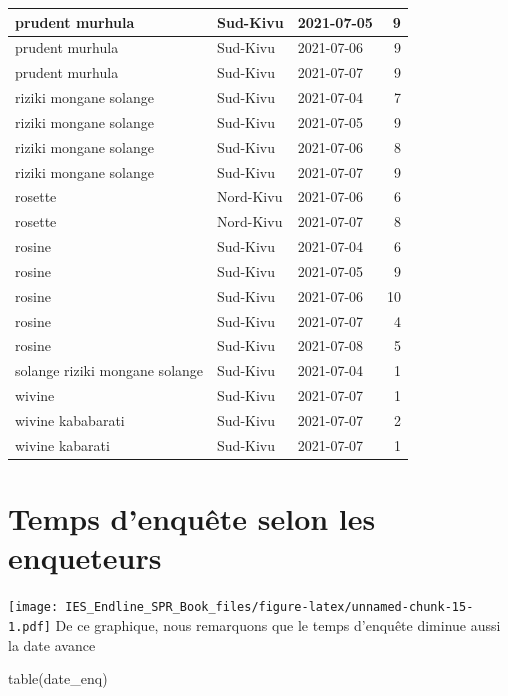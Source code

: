 \documentclass[
]{book}
\newenvironment{Shaded}{\begin{snugshade}}{\end{snugshade}}
\newcommand{\FunctionTok}[1]{\textcolor[rgb]{0.00,0.00,0.00}{#1}}
\newcommand{\NormalTok}[1]{#1}
\begin{document}
\begin{table}
\begin{tabular}[t]{l|l|l|r}
\hline
prudent murhula & Sud-Kivu & 2021-07-05 & 9\\
\hline
prudent murhula & Sud-Kivu & 2021-07-06 & 9\\
\hline
prudent murhula & Sud-Kivu & 2021-07-07 & 9\\
\hline
riziki mongane solange & Sud-Kivu & 2021-07-04 & 7\\
\hline
riziki mongane solange & Sud-Kivu & 2021-07-05 & 9\\
\hline
riziki mongane solange & Sud-Kivu & 2021-07-06 & 8\\
\hline
riziki mongane solange & Sud-Kivu & 2021-07-07 & 9\\
\hline
rosette & Nord-Kivu & 2021-07-06 & 6\\
\hline
rosette & Nord-Kivu & 2021-07-07 & 8\\
\hline
rosine & Sud-Kivu & 2021-07-04 & 6\\
\hline
rosine & Sud-Kivu & 2021-07-05 & 9\\
\hline
rosine & Sud-Kivu & 2021-07-06 & 10\\
\hline
rosine & Sud-Kivu & 2021-07-07 & 4\\
\hline
rosine & Sud-Kivu & 2021-07-08 & 5\\
\hline
solange riziki mongane solange & Sud-Kivu & 2021-07-04 & 1\\
\hline
wivine & Sud-Kivu & 2021-07-07 & 1\\
\hline
wivine kababarati & Sud-Kivu & 2021-07-07 & 2\\
\hline
wivine kabarati & Sud-Kivu & 2021-07-07 & 1\\
\hline
\end{tabular}
\end{table}

\hypertarget{temps-denquuxeate-selon-les-enqueteurs}{%
\section{Temps d'enquête selon les enqueteurs}\label{temps-denquuxeate-selon-les-enqueteurs}}

\texttt{[image: IES\_Endline\_SPR\_Book\_files/figure-latex/unnamed-chunk-15-1.pdf]}
De ce graphique, nous remarquons que le temps d'enquête diminue aussi la date avance

\begin{Shaded}
\begin{Highlighting}[]
\FunctionTok{table}\NormalTok{(date\_enq)}
\end{Highlighting}
\end{Shaded}
\end{document}
